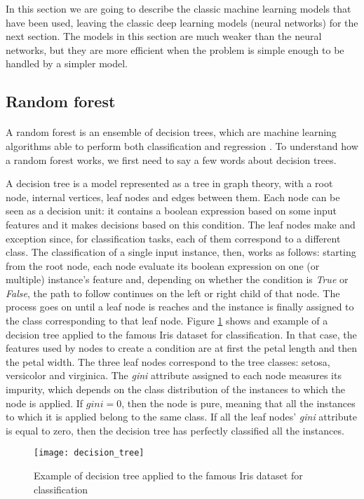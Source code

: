 In this section we are going to describe the classic machine learning models that have been used, leaving the classic deep learning models (neural networks) for the next section. The models in this section are much weaker than the neural networks, but they are more efficient when the problem is simple enough to be handled by a simpler model.

\subsection{Random forest}
\paragraph{} A random forest is an ensemble of decision trees, which are machine learning algorithms able to perform both classification and regression \cite{OReilly:handsonML}. To understand how a random forest works, we first need to say a few words about decision trees.

A decision tree is a model represented as a tree in graph theory, with a root node, internal vertices, leaf nodes and edges between them. Each node can be seen as a decision unit: it contains a boolean expression based on some input features and it makes decisions based on this condition. The leaf nodes make and exception since, for classification tasks, each of them correspond to a different class. The classification of a single input instance, then, works as follows: starting from the root node, each node evaluate its boolean expression on one (or multiple) instance's feature and, depending on whether the condition is \textit{True} or \textit{False}, the path to follow continues on the left or right child of that node. The process goes on until a leaf node is reaches and the instance is finally assigned to the class corresponding to that leaf node. Figure \ref{fig:decision_tree} shows and example of a decision tree applied to the famous Iris dataset for classification. In that case, the features used by nodes to create a condition are at first the petal length and then the petal width. The three leaf nodes correspond to the tree classes: setosa, versicolor and virginica. The \textit{gini} attribute assigned to each node measures its impurity, which depends on the class distribution of the instances to which the node is applied. If $gini = 0$, then the node is pure, meaning that all the instances to which it is applied belong to the same class. If all the leaf nodes' \textit{gini} attribute is equal to zero, then the decision tree has perfectly classified all the instances.
\begin{figure}[htbp]
    \centering
    \texttt{[image: decision\_tree]}
    \caption{Example of decision tree applied to the famous Iris dataset for classification}
    \label{fig:decision_tree}
\end{figure}

